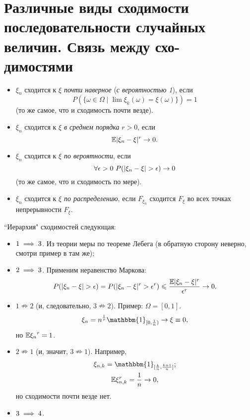 \section{Различные виды сходимости последовательности случайных величин. Связь между схо- димостями}

\begin{definition}
    \enewline
         \begin{itemize}
             \item $\xi_n$ сходится к $\xi$ \textit{почти наверное} (\textit{с вероятностью 1}), если
                   $$P(\{\omega \in \Omega \mid \lim\xi_k(\omega) = \xi(\omega)\}) = 1$$ (то же самое, что и сходимость почти везде).
    
             \item $\xi_n$ сходится к $\xi$ \textit{в среднем порядка} $r > 0$, если 
             $$\mathbb{E} \lvert\xi_n - \xi\rvert^r\rightarrow 0.$$
    
             \item $\xi_n$ сходится к $\xi$ \textit{по вероятности}, если 
             $$\forall \epsilon > 0 \ P(\lvert\xi_n - \xi\rvert > \epsilon)\rightarrow 0$$ 
             (то же самое, что и сходимость по мере).
    
             \item $\xi_n$ сходится к $\xi$ \textit{по распределению}, если $F_{\xi_n}$ сходится $F_\xi$ во всех точках непрерывности $F_\xi$.
         \end{itemize}
     \end{definition}
    
    ``Иерархия" сходимостей следующая:
    
    \begin{itemize}
        \item  $1\implies 3$. Из теории меры по теореме Лебега (в обратную сторону неверно, смотри пример в там же);
        \item $2\implies 3$. Применим неравенство Маркова:
        $$P(\lvert\xi_n - \xi\rvert >\epsilon) = P(\lvert\xi_n - \xi\rvert^r> \epsilon^r)  \leqslant  \frac{\mathbb{E} \lvert\xi_n - \xi\rvert^r}{\epsilon^r} \rightarrow 0.$$
        \item  $1\nRightarrow 2$ (и, следовательно, $3\nRightarrow 2$).  Пример: $\Omega = [0, 1]$.
        $$\xi_n = n^\frac{1}{r}\mathbbm{1}_{[0, \frac{1}{n})} \rightarrow \xi \equiv 0,$$ но
     $\mathbb{E} {\xi_n}^r = 1$.
     \item  $2\nRightarrow 1$ (и, значит, $3\nRightarrow 1$).
     Например,
     \begin{gather*}
         \xi_{n, k} = \mathbbm{1}_{[\frac{k}{n}, \frac{k + 1}{n}]};\\
         \EE \xi_{n, k}^r = \frac{1}{n}\rightarrow 0,
     \end{gather*}
     но сходимости почти везде нет.
        \item  $3\implies 4$. 
    \end{itemize}
    
